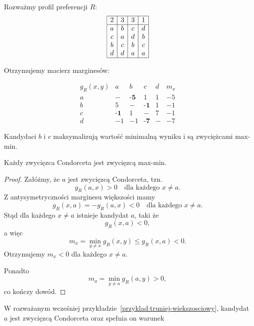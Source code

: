 \documentclass[12pt,a4paper]{mwrep}
\begin{document}
	\begin{example}
		Rozważmy profil preferencji \(R\):
		\[
		\begin{array}{|c|c|c|c|}
			\hline
			2 & 3 & 3 & 1\\
			\hline
			a & b & c & d\\
			c & a & d & b\\
			b & c & b & c\\
			d & d & a & a\\
			\hline
		\end{array}
		\]
		
		Otrzymujemy macierz marginesów:
		\begin{table}[H]
			\centering
			\[
			\begin{array}{c|cccc|c}
				g_R(x,y) & a & b & c & d & m_x\\
				\hline
				a & - & \textbf{-5} & 1 & 1 & -5\\
				b & 5 & - & \textbf{-1} & 1 & -1\\
				c & \textbf{-1} & 1 & - & 7 & -1\\
				d & -1 & -1 & \textbf{-7} & - & -7
			\end{array}
			\]
			\caption{Macierz marginesów większości profilu \(R\)}
		\end{table}
		
		Kandydaci \(b\) i \(c\) maksymalizują wartość minimalną wyniku i są zwyciężcami max-min.
	\end{example}
	
	\begin{wniosek}
		Każdy zwycięzca Condorceta jest zwycięzcą max-min.
	\end{wniosek}
	
	\begin{proof}
		Załóżmy, że \(a\) jest zwycięzcą Condorceta, tzn.
		\[
		g_R(a,x) > 0 \quad \text{dla każdego } x \neq a.
		\]
		Z antysymetryczności marginesu większości mamy
		\[
		g_R(x,a) = -g_R(a,x) < 0 \quad \text{dla każdego } x \neq a.
		\]
		Stąd dla każdego \(x \neq a\) istnieje kandydat \(a\), taki że
		\[
		g_R(x,a) < 0,
		\]
		a więc
		\[
		m_x = \min_{y \neq x} g_R(x,y) \le g_R(x,a) < 0.
		\]
		Otrzymujemy \(m_x < 0\) dla każdego \(x \neq a\).
		
		Ponadto
		\[
		m_a = \min_{y \neq a} g_R(a,y) > 0,
		\]
		co kończy dowód.
	\end{proof}
	
	W rozważanym wcześniej przykładzie~\ref{przyklad:truniej-wiekszosciowy}, kandydat \(a\) jest zwycięzcą Condorceta oraz spełnia on warunek
	
\end{document}
